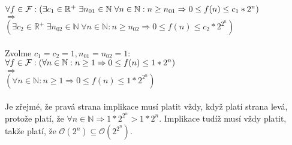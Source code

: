 \documentclass[a4paper,11pt]{article}[24.3.2010]
\begin{document}
\begin{enumerate}
\begin{enumerate}
      $\forall f \in \mathcal{F} : \\ (\exists c_{1} \in \mathbb{R}^+ \hspace{3pt} \exists n_{01} \in \mathbb{N} \hspace{3pt} \forall n \in \mathbb{N} : n \geq n_{01} \Rightarrow 0 \leq f(n) \leq c_{1}*2^n)$\\
      $\Rightarrow$\\
      $(\exists c_{2} \in \mathbb{R}^+ \hspace{3pt} \exists n_{02} \in \mathbb{N} \hspace{3pt} \forall n \in \mathbb{N} : n \geq n_{02} \Rightarrow 0 \leq f(n) \leq c_{2}*2^{2^n})$\\\\
      Zvolme $c_{1}=c_{2}=1,n_{01}=n_{02}=1$:\\
      $\forall f \in \mathcal{F} : \\ (\forall n \in \mathbb{N} : n \geq 1 \Rightarrow 0 \leq f(n) \leq 1*2^n)$\\
      $\Rightarrow$\\
      $(\forall n \in \mathbb{N} : n \geq 1 \Rightarrow 0 \leq f(n) \leq 1*2^{2^n})$\\\\
      Je zřejmé, že pravá strana implikace musí platit vždy, když platí strana levá, protože platí, že $\forall n \in \mathbb{N} \Rightarrow 1*2^{2^n} > 1*2^n$. Implikace tudíž musí vždy platit, takže platí, že $\mathcal{O}(2^n) \subseteq \mathcal{O}(2^{2^n})$.\\


\end{enumerate}
\end{enumerate}
\end{document}
